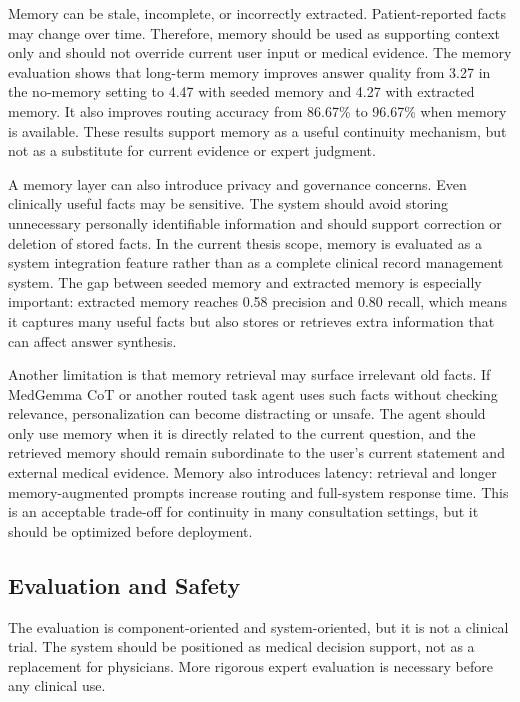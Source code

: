 Memory can be stale, incomplete, or incorrectly extracted. Patient-reported facts may change over time. Therefore, memory should be used as supporting context only and should not override current user input or medical evidence. The memory evaluation shows that long-term memory improves answer quality from 3.27 in the no-memory setting to 4.47 with seeded memory and 4.27 with extracted memory. It also improves routing accuracy from 86.67\% to 96.67\% when memory is available. These results support memory as a useful continuity mechanism, but not as a substitute for current evidence or expert judgment.

A memory layer can also introduce privacy and governance concerns. Even clinically useful facts may be sensitive. The system should avoid storing unnecessary personally identifiable information and should support correction or deletion of stored facts. In the current thesis scope, memory is evaluated as a system integration feature rather than as a complete clinical record management system. The gap between seeded memory and extracted memory is especially important: extracted memory reaches 0.58 precision and 0.80 recall, which means it captures many useful facts but also stores or retrieves extra information that can affect answer synthesis.

Another limitation is that memory retrieval may surface irrelevant old facts. If MedGemma CoT or another routed task agent uses such facts without checking relevance, personalization can become distracting or unsafe. The agent should only use memory when it is directly related to the current question, and the retrieved memory should remain subordinate to the user's current statement and external medical evidence. Memory also introduces latency: retrieval and longer memory-augmented prompts increase routing and full-system response time. This is an acceptable trade-off for continuity in many consultation settings, but it should be optimized before deployment.

\subsection{Evaluation and Safety}

The evaluation is component-oriented and system-oriented, but it is not a clinical trial. The system should be positioned as medical decision support, not as a replacement for physicians. More rigorous expert evaluation is necessary before any clinical use.

